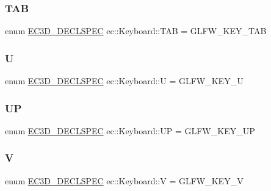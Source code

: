 \mbox{\label{classec_1_1_keyboard_aef71873ca11f1076aaad6ea11d3d8aea}} 
\subsubsection{\texorpdfstring{T\+AB}{TAB}}
{\footnotesize\ttfamily enum \mbox{\hyperlink{_common_8h_aac42573e202ca3dd4d259c81691e2369}{E\+C3\+D\+\_\+\+D\+E\+C\+L\+S\+P\+EC}} ec\+::\+Keyboard\+::\+T\+AB = G\+L\+F\+W\+\_\+\+K\+E\+Y\+\_\+\+T\+AB}

\mbox{\label{classec_1_1_keyboard_a766e2c870a29b0e0cfdf87346126f9aa}} 
\subsubsection{\texorpdfstring{U}{U}}
{\footnotesize\ttfamily enum \mbox{\hyperlink{_common_8h_aac42573e202ca3dd4d259c81691e2369}{E\+C3\+D\+\_\+\+D\+E\+C\+L\+S\+P\+EC}} ec\+::\+Keyboard\+::U = G\+L\+F\+W\+\_\+\+K\+E\+Y\+\_\+U}

\mbox{\label{classec_1_1_keyboard_a6da2eed1074dc9feaf4b68ab3da684d8}} 
\subsubsection{\texorpdfstring{UP}{UP}}
{\footnotesize\ttfamily enum \mbox{\hyperlink{_common_8h_aac42573e202ca3dd4d259c81691e2369}{E\+C3\+D\+\_\+\+D\+E\+C\+L\+S\+P\+EC}} ec\+::\+Keyboard\+::\+UP = G\+L\+F\+W\+\_\+\+K\+E\+Y\+\_\+\+UP}

\mbox{\label{classec_1_1_keyboard_a9b00b29bff502c4e5409b088da7270de}} 
\subsubsection{\texorpdfstring{V}{V}}
{\footnotesize\ttfamily enum \mbox{\hyperlink{_common_8h_aac42573e202ca3dd4d259c81691e2369}{E\+C3\+D\+\_\+\+D\+E\+C\+L\+S\+P\+EC}} ec\+::\+Keyboard\+::V = G\+L\+F\+W\+\_\+\+K\+E\+Y\+\_\+V}

